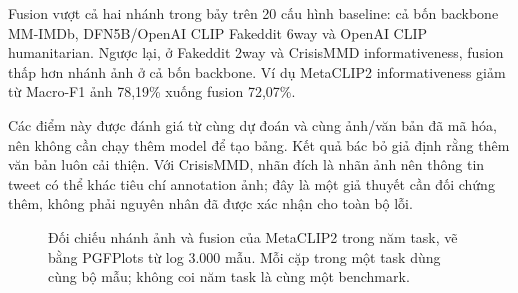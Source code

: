 \documentclass[12pt,a4paper]{article}
\begin{document}
Fusion vượt cả hai nhánh trong bảy trên 20 cấu hình baseline: cả bốn backbone MM-IMDb, DFN5B/OpenAI CLIP Fakeddit 6way và OpenAI CLIP humanitarian. Ngược lại, ở Fakeddit 2way và CrisisMMD informativeness, fusion thấp hơn nhánh ảnh ở cả bốn backbone. Ví dụ MetaCLIP2 informativeness giảm từ Macro-F1 ảnh 78,19\% xuống fusion 72,07\%.

Các điểm này được đánh giá từ cùng dự đoán và cùng ảnh/văn bản đã mã hóa, nên không cần chạy thêm model để tạo bảng. Kết quả bác bỏ giả định rằng thêm văn bản luôn cải thiện. Với CrisisMMD, nhãn đích là nhãn ảnh nên thông tin tweet có thể khác tiêu chí annotation ảnh; đây là một giả thuyết cần đối chứng thêm, không phải nguyên nhân đã được xác nhận cho toàn bộ lỗi.

\begin{figure}[H]\centering
{}
\caption{Đối chiếu nhánh ảnh và fusion của MetaCLIP2 trong năm task, vẽ bằng PGFPlots từ log 3.000 mẫu. Mỗi cặp trong một task dùng cùng bộ mẫu; không coi năm task là cùng một benchmark.}\label{fig:fusion}
\end{figure}
\end{document}
